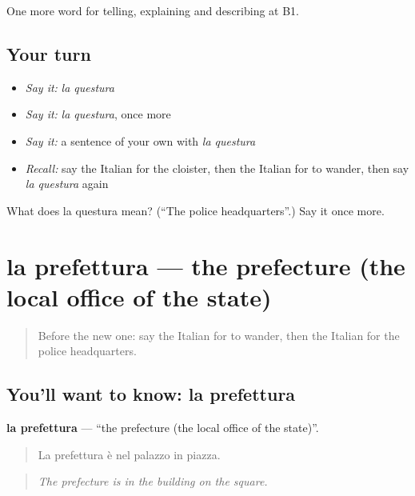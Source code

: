 \begin{grammarlens}[title={What you've built}]
One more word for telling, explaining and describing at B1.
\end{grammarlens}

\subsection*{Your turn}
\begin{itemize}
\raggedright
  \item \emph{Say it:} \emph{la questura}
  \item \emph{Say it:} \emph{la questura}, once more
  \item \emph{Say it:} a sentence of your own with \emph{la questura}
  \item \emph{Recall:} say the Italian for the cloister, then the Italian for to wander, then say \emph{la questura} again
\end{itemize}

\begin{tcolorbox}[breakable,colback=teal!4,colframe=teal!35!black,title={Before you move on}]
What does la questura mean? (\textquotedblleft{}The police headquarters\textquotedblright{}.) Say it once more.
\end{tcolorbox}
\section[la prefettura]{la prefettura — the prefecture (the local office of the state)}

\label{lesson:IT-C447-prefettura}



\begin{quote}
Before the new one: say the Italian for to wander, then the Italian for the police headquarters.
\end{quote}

\subsection*{You'll want to know: la prefettura}
\textbf{la prefettura} — \textquotedblleft{}the prefecture (the local office of the state)\textquotedblright{}.

\begin{quote}
La prefettura è nel palazzo in piazza.
\end{quote}

\begin{quote}
\emph{The prefecture is in the building on the square.}
\end{quote}

